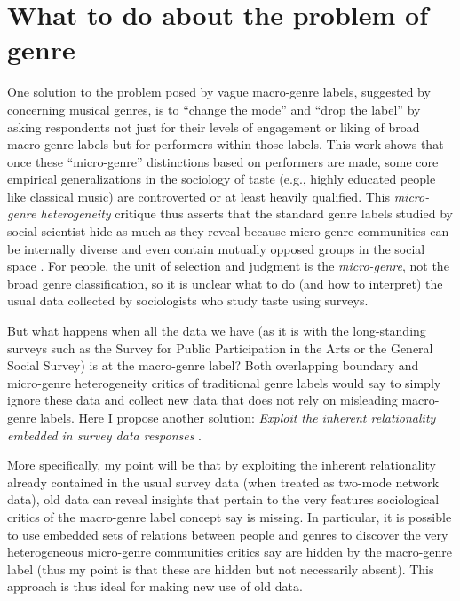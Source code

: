 \documentclass[a4paper,12pt]{extarticle}
\begin{document}
\section{What to do about the problem of genre}
One solution to the problem posed by vague macro-genre labels, suggested by \citet{vlegels2015music, vlegels2017music} concerning musical genres, is to ``change the mode'' and ``drop the label'' by asking respondents not just for their levels of engagement or liking of broad macro-genre labels but for performers within those labels. This work shows that once these ``micro-genre'' distinctions based on performers are made, some core empirical generalizations in the sociology of taste (e.g., highly educated people like classical music) are controverted or at least heavily qualified. This \textit{micro-genre heterogeneity} critique thus asserts that the standard genre labels studied by social scientist hide as much as they reveal because micro-genre communities can be internally diverse and even contain mutually opposed groups in the social space \citep{flemmen_etal18}. For people, the unit of selection and judgment is the {\em micro-genre}, not the broad genre classification, so it is unclear what to do (and how to interpret) the usual data collected by sociologists who study taste using surveys. 

But what happens when all the data we have (as it is with the long-standing surveys such as the Survey for Public Participation in the Arts or the General Social Survey) is at the macro-genre label? Both overlapping boundary and micro-genre heterogeneity critics of traditional genre labels would say to simply ignore these data and collect new data that does not rely on misleading macro-genre labels. Here I propose another solution: {\em Exploit the inherent relationality embedded in survey data responses} \citep{goldberg2011mapping, boutyline2017belief, lizardo18}. 

More specifically, my point will be that by exploiting the inherent relationality already contained in the usual survey data (when treated as two-mode network data), old data can reveal insights that pertain to the very features sociological critics of the macro-genre label concept say is missing. In particular, it is possible to use embedded sets of relations between people and genres to discover the very heterogeneous micro-genre communities critics say are hidden by the macro-genre label (thus my point is that these are hidden but not necessarily absent). This approach is thus ideal for making new use of old data. 	
\end{document}
